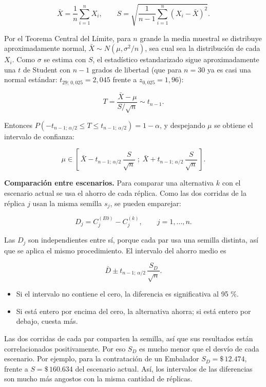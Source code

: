\documentclass[11pt,a4paper]{article}
\begin{document}
\[\bar{X} = \frac{1}{n}\sum_{i=1}^{n} X_i, \qquad S = \sqrt{\frac{1}{n-1}\sum_{i=1}^{n}\left(X_i - \bar{X}\right)^2}.\]

Por el Teorema Central del Límite, para $n$ grande la media muestral se distribuye aproximadamente normal, $\bar{X} \sim N\!\left(\mu, \sigma^2/n\right)$, sea cual sea la distribución de cada $X_i$. Como $\sigma$ se estima con $S$, el estadístico estandarizado sigue aproximadamente una $t$ de Student con $n-1$ grados de libertad (que para $n = 30$ ya es casi una normal estándar: $t_{29;\,0{,}025} = 2{,}045$ frente a $z_{0{,}025} = 1{,}96$):

\[T = \frac{\bar{X} - \mu}{S/\sqrt{n}} \sim t_{n-1}.\]

Entonces $P\left(-t_{n-1;\,\alpha/2} \le T \le t_{n-1;\,\alpha/2}\right) = 1 - \alpha$, y despejando $\mu$ se obtiene el intervalo de confianza:

\[\mu \in \left[\, \bar{X} - t_{n-1;\,\alpha/2}\,\frac{S}{\sqrt{n}} \; ; \; \bar{X} + t_{n-1;\,\alpha/2}\,\frac{S}{\sqrt{n}} \,\right].\]

\textbf{Comparación entre escenarios.} Para comparar una alternativa $k$ con el escenario actual se usa el ahorro de cada réplica. Como las dos corridas de la réplica $j$ usan la misma semilla $s_j$, se pueden emparejar:

\[D_j = C_j^{(E0)} - C_j^{(k)}, \qquad j = 1, \dots, n.\]

Las $D_j$ son independientes entre sí, porque cada par usa una semilla distinta, así que se aplica el mismo procedimiento. El intervalo del ahorro medio es

\[\bar{D} \pm t_{n-1;\,\alpha/2}\,\frac{S_D}{\sqrt{n}}.\]

\begin{itemize}
\item Si el intervalo no contiene el cero, la diferencia es significativa al 95 \%.
\item Si está entero por encima del cero, la alternativa ahorra; si está entero por debajo, cuesta más.
\end{itemize}

Las dos corridas de cada par comparten la semilla, así que sus resultados están correlacionados positivamente. Por eso $S_D$ es mucho menor que el desvío de cada escenario. Por ejemplo, para la contratación de un Embalador $S_D = \$\,12.474$, frente a $S = \$\,160.634$ del escenario actual. Así, los intervalos de las diferencias son mucho más angostos con la misma cantidad de réplicas.
\end{document}
